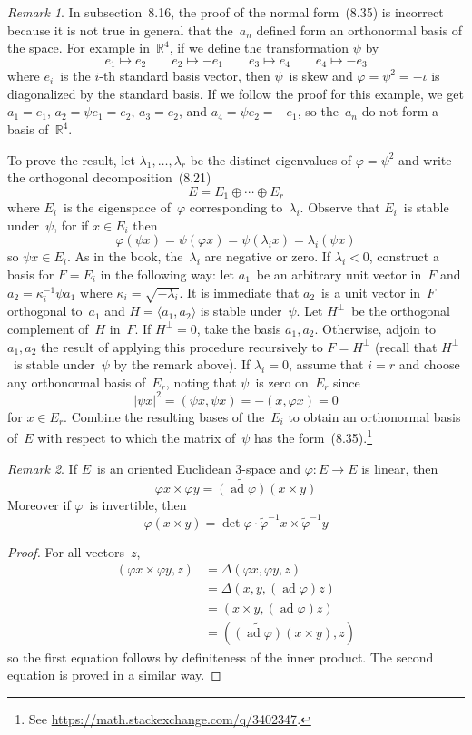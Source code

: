 \documentclass[letterpaper,12pt]{article}
\newcommand{\R}{\mathbb{R}}
\DeclareMathOperator{\ad}{ad}
\newcommand{\dsum}{\oplus}
\newcommand{\mult}{\cdot}
\newcommand{\cross}{\times}
\newcommand{\gen}[1]{\langle#1\rangle}
\newcommand{\oc}[1]{#1^{\perp}}
\newcommand{\iprod}[2]{(#1,#2)}
\newcommand{\norm}[1]{|#1|}
\newcommand{\adj}[1]{\widetilde{#1}}
\theoremstyle{definition}
\theoremstyle{remark}
\newtheorem*{rmk}{Remark}
\begin{document}
\begin{rmk}
In subsection~8.16, the proof of the normal form~(8.35) is incorrect because it is not true in general that the~\(a_n\) defined form an orthonormal basis of the space. For example in~\(\R^4\), if we define the transformation \(\psi\) by
\[e_1\mapsto e_2\qquad e_2\mapsto -e_1\qquad e_3\mapsto e_4\qquad e_4\mapsto -e_3\]
where \(e_i\)~is the \(i\)-th standard basis vector, then \(\psi\)~is skew and \(\varphi=\psi^2=-\iota\) is diagonalized by the standard basis. If we follow the proof for this example, we get \(a_1=e_1\), \(a_2=\psi e_1=e_2\), \(a_3=e_2\), and \(a_4=\psi e_2=-e_1\), so the~\(a_n\) do not form a basis of~\(\R^4\).

To prove the result, let \(\lambda_1,\ldots,\lambda_r\) be the distinct eigenvalues of \(\varphi=\psi^2\) and write the orthogonal decomposition~(8.21)
\[E=E_1\dsum\cdots\dsum E_r\]
where \(E_i\)~is the eigenspace of~\(\varphi\) corresponding to~\(\lambda_i\). Observe that \(E_i\)~is stable under~\(\psi\), for if \(x\in E_i\) then
\[\varphi(\psi x)=\psi(\varphi x)=\psi(\lambda_i x)=\lambda_i(\psi x)\]
so \(\psi x\in E_i\). As in the book, the~\(\lambda_i\) are negative or zero. If \(\lambda_i<0\), construct a basis for \(F=E_i\) in the following way: let \(a_1\)~be an arbitrary unit vector in~\(F\) and \(a_2=\kappa_i^{-1}\psi a_1\) where \(\kappa_i=\sqrt{-\lambda_i}\). It is immediate that \(a_2\)~is a unit vector in~\(F\) orthogonal to~\(a_1\) and \(H=\gen{a_1,a_2}\) is stable under~\(\psi\). Let \(\oc{H}\)~be the orthogonal complement of~\(H\) in~\(F\). If \(\oc{H}=0\), take the basis \(a_1,a_2\). Otherwise, adjoin to \(a_1,a_2\) the result of applying this procedure recursively to \(F=\oc{H}\) (recall that \(\oc{H}\)~is stable under~\(\psi\) by the remark above). If \(\lambda_i=0\), assume that \(i=r\) and choose any orthonormal basis of~\(E_r\), noting that \(\psi\)~is zero on~\(E_r\) since
\[\norm{\psi x}^2=\iprod{\psi x}{\psi x}=-\iprod{x}{\varphi x}=0\]
for \(x\in E_r\). Combine the resulting bases of the~\(E_i\) to obtain an orthonormal basis of~\(E\) with respect to which the matrix of~\(\psi\) has the form~(8.35).\footnote{See \url{https://math.stackexchange.com/q/3402347}.}
\end{rmk}

\begin{rmk}
If \(E\)~is an oriented Euclidean \(3\)-space and \(\varphi:E\to E\) is linear, then
\[\varphi x\cross\varphi y=\adj{(\ad\varphi)}(x\cross y)\]
Moreover if \(\varphi\)~is invertible, then
\[\varphi(x\cross y)=\det\varphi\mult\adj{\varphi}^{-1}x\cross\adj{\varphi}^{-1}y\]
\end{rmk}
\begin{proof}
For all vectors~\(z\),
\begin{align*}
\iprod{\varphi x\cross\varphi y}{z}&=\Delta(\varphi x,\varphi y,z)\\
	&=\Delta(x,y,(\ad\varphi)z)\\
	&=\iprod{x\cross y}{(\ad\varphi)z}\\
	&=\iprod{\adj{(\ad\varphi)}(x\cross y)}{z}
\end{align*}
so the first equation follows by definiteness of the inner product. The second equation is proved in a similar way.
\end{proof}
\end{document}
